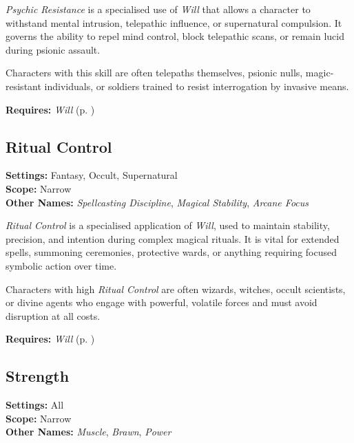 \emph{Psychic Resistance} is a specialised use of \emph{Will} that allows a character to withstand mental intrusion, telepathic influence, or supernatural compulsion. It governs the ability to repel mind control, block telepathic scans, or remain lucid during psionic assault.

Characters with this skill are often telepaths themselves, psionic nulls, magic-resistant individuals, or soldiers trained to resist interrogation by invasive means.

\vspace{0.5\baselineskip}
\noindent\textbf{Requires:} \emph{Will} (p. \pageref{skill:will})


\subsection{Ritual Control}\label{skill:ritual-control}
\textbf{Settings:} Fantasy, Occult, Supernatural\\
\textbf{Scope:} Narrow\\
\textbf{Other Names:} \emph{Spellcasting Discipline}, \emph{Magical Stability}, \emph{Arcane Focus}\\
\vspace{\baselineskip}

\emph{Ritual Control} is a specialised application of \emph{Will}, used to maintain stability, precision, and intention during complex magical rituals. It is vital for extended spells, summoning ceremonies, protective wards, or anything requiring focused symbolic action over time.

Characters with high \emph{Ritual Control} are often wizards, witches, occult scientists, or divine agents who engage with powerful, volatile forces and must avoid disruption at all costs.

\vspace{0.5\baselineskip}
\noindent\textbf{Requires:} \emph{Will} (p. \pageref{skill:will})



\subsection{Strength}\label{skill:strength}
\textbf{Settings:} All\\
\textbf{Scope:} Narrow\\
\textbf{Other Names:} \emph{Muscle}, \emph{Brawn}, \emph{Power}\\
\vspace{\baselineskip}

